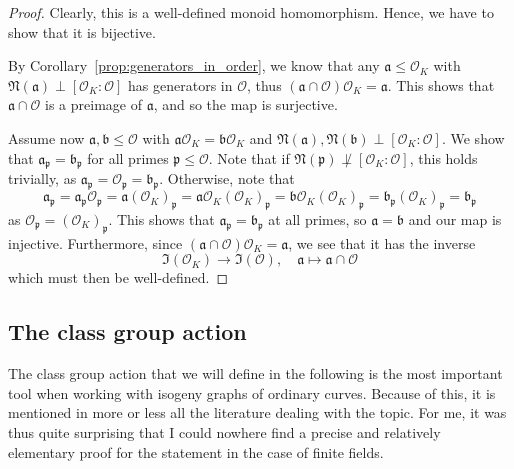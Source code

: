 \documentclass{ociamthesis}
\newcommand{\Norm}{\mathfrak{N}}
\renewcommand{\a}{\mathfrak{a}}
\newcommand{\p}{\mathfrak{p}}
\renewcommand{\b}{\mathfrak{b}}
\renewcommand{\O}{\mathcal{O}}
\theoremstyle{definition}
\begin{document}
\begin{proof}
    Clearly, this is a well-defined monoid homomorphism.
    Hence, we have to show that it is bijective.

    By Corollary~\ref{prop:generators_in_order}, we know that any $\a \leq \O_K$ with $\Norm(\a) \perp [\O_K : \O]$ has generators in $\O$, thus $(\a \cap \O)\O_K = \a$.
    This shows that $\a \cap \O$ is a preimage of $\a$, and so the map is surjective. 

    Assume now $\a, \b \leq \O$ with $\a\O_K = \b\O_K$ and $\Norm(\a), \Norm(\b) \perp [\O_K : \O]$.
    We show that $\a_\p = \b_\p$ for all primes $\p \leq \O$.
    Note that if $\Norm(\p) \not\perp [\O_K : \O]$, this holds trivially, as $\a_\p = \O_\p = \b_\p$.
    Otherwise, note that
    \begin{equation*}
        \a_\p = \a_\p \O_\p = \a (\O_K)_\p = \a\O_K(\O_K)_\p = \b\O_K(\O_K)_\p = \b_\p (\O_K)_\p = \b_\p
    \end{equation*}
    as $\O_\p = (\O_K)_\p$.
    This shows that $\a_\p = \b_\p$ at all primes, so $\a = \b$ and our map is injective.
    Furthermore, since $(\a \cap \O)\O_K = \a$, we see that it has the inverse
    \begin{equation*}
        \mathfrak{I}(\O_K) \to \mathfrak{I}(\O), \quad \a \mapsto \a \cap \O
    \end{equation*}
    which must then be well-defined.
\end{proof}

\subsection{The class group action}
The class group action that we will define in the following is the most important tool when working with isogeny graphs of ordinary curves.
Because of this, it is mentioned in more or less all the literature dealing with the topic.
For me, it was thus quite surprising that I could nowhere find a precise and relatively elementary proof for the statement in the case of finite fields.
\end{document}
